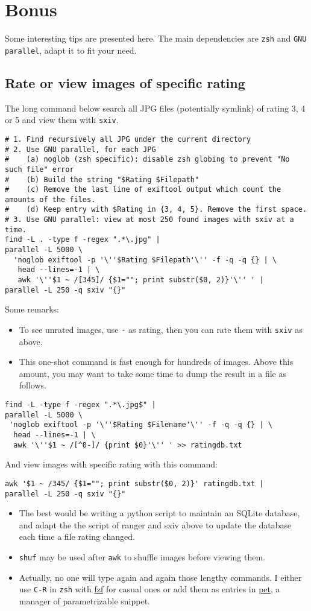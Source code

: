 \documentclass[11pt]{article}
\begin{document}
\section{Bonus}
\label{sec:org636e82c}
Some interesting tips are presented here.
The main dependencies are \texttt{zsh} and \texttt{GNU parallel}, adapt it
to fit your need.
\subsection{Rate or view images of specific rating}
\label{sec:org4d6f5b5}
The long command below search all JPG files (potentially symlink) of rating 3, 4
or 5 and view them with \texttt{sxiv}.
\begin{verbatim}
# 1. Find recursively all JPG under the current directory
# 2. Use GNU parallel, for each JPG 
#    (a) noglob (zsh specific): disable zsh globing to prevent "No such file" error
#    (b) Build the string "$Rating $Filepath"
#    (c) Remove the last line of exiftool output which count the amounts of the files.
#    (d) Keep entry with $Rating in {3, 4, 5}. Remove the first space.
# 3. Use GNU parallel: view at most 250 found images with sxiv at a time.
find -L . -type f -regex ".*\.jpg" | 
parallel -L 5000 \
  'noglob exiftool -p '\''$Rating $Filepath'\'' -f -q -q {} | \
   head --lines=-1 | \
   awk '\''$1 ~ /[345]/ {$1=""; print substr($0, 2)}'\'' ' |
parallel -L 250 -q sxiv "{}" 
\end{verbatim}
Some remarks:
\begin{itemize}
\item To see unrated images, use \texttt{-} as rating, then you can rate them with \texttt{sxiv} as above.
\item This one-shot command is fast enough for hundreds of images. Above this amount, you may
want to take some time to dump the result in a file as follows.
\end{itemize}
\begin{verbatim}
find -L -type f -regex ".*\.jpg$" | 
parallel -L 5000 \
 'noglob exiftool -p '\''$Rating $Filename'\'' -f -q -q {} | \
  head --lines=-1 | \
  awk '\''$1 ~ /[^0-]/ {print $0}'\'' ' >> ratingdb.txt
\end{verbatim}
And view images with specific rating with this command:
\begin{verbatim}
awk '$1 ~ /345/ {$1=""; print substr($0, 2)}' ratingdb.txt |
parallel -L 250 -q sxiv "{}" 
\end{verbatim}
\begin{itemize}
\item The best would be writing a python script to maintain an SQLite database, and
adapt the the script of ranger and sxiv above to update the database each time a
file rating changed.
\item \texttt{shuf} may be used after \texttt{awk} to shuffle images before viewing them.
\item Actually, no one will type again and again those lengthy commands. I either
use \texttt{C-R} in \texttt{zsh} with \href{https://github.com/junegunn/fzf}{fzf} for casual ones or add them as entries in \href{https://github.com/knqyf263/pet}{pet}, a
manager of parametrizable snippet.
\end{itemize}
\end{document}
